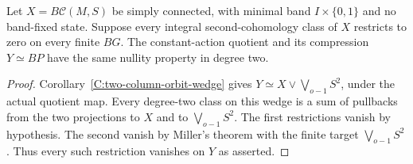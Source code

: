 \begin{lemma}
\label{C:orbit-quotient-local-nullity}
Let $X=B\mathcal C(M,S)$ be simply connected, with minimal band
$I\times\{0,1\}$ and no band-fixed state. Suppose every integral
second-cohomology class of $X$ restricts to zero on every finite $BG$.
The constant-action quotient and its compression $Y\simeq BP$ have
the same nullity property in degree two.
\end{lemma}
\begin{proof}
Corollary~\ref{C:two-column-orbit-wedge} gives
$Y\simeq X\vee\bigvee_{o-1}S^2$, under the actual quotient map.
Every degree-two class on this wedge is a sum of pullbacks from the
two projections to $X$ and to $\bigvee_{o-1}S^2$.
The first restrictions vanish by hypothesis. The second vanish by
Miller's theorem with the finite target $\bigvee_{o-1}S^2$.
Thus every such restriction vanishes on $Y$ as asserted.
\end{proof}

